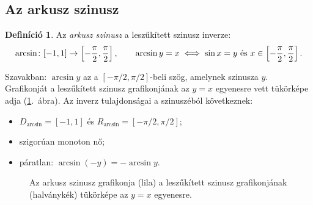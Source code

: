 \documentclass[11pt]{scrartcl}
\theoremstyle{definition}
\newtheorem{definition}{Definíció}
\theoremstyle{remark}
\begin{document}
\subsection{Az arkusz szinusz}

\begin{definition}
	Az \emph{arkusz szinusz} a leszűkített szinusz inverze:
	\[
		\arcsin\colon [-1, 1] \to \left[-\frac{\pi}{2}, \frac{\pi}{2}\right],
		\qquad
		\arcsin y = x \iff \sin x = y \text{ és }
		x \in \left[-\frac{\pi}{2}, \frac{\pi}{2}\right]\text.
	\]
\end{definition}

Szavakban: $\arcsin y$ az a $\left[-\pi / 2, \pi / 2\right]$-beli
szög, amelynek szinusza $y$. Grafikonját a leszűkített szinusz grafikonjának
az $y = x$ egyenesre vett tükörképe adja (\ref{fig:arcsin}.~ábra). Az inverz
tulajdonságai a szinuszéból következnek:
\begin{itemize}
	\item $D_{\arcsin} = [-1, 1]$ és
	      $R_{\arcsin} = \left[-\pi / 2, \pi / 2\right]$;
	\item szigorúan monoton nő;
	\item páratlan: $\arcsin(-y) = -\arcsin y$.
\end{itemize}

\begin{figure}[ht]
	\centering
	\caption{Az arkusz szinusz grafikonja (lila) a leszűkített szinusz
		grafikonjának (halványkék) tükörképe az $y = x$ egyenesre.}
	\label{fig:arcsin}
\end{figure}
\end{document}
